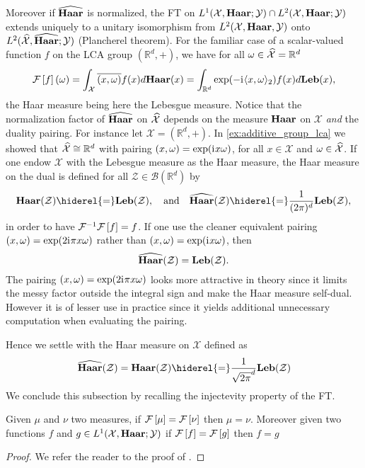 \paragraph{}
Moreover if $\widehat{\mathbf{Haar}}$ is normalized, the \acl{FT} on $L^1(\mathcal{X},\mathbf{Haar};\mathcal{Y})\cap L^2(\mathcal{X},\mathbf{Haar};\mathcal{Y})$ extends uniquely to a unitary isomorphism from $L^2(\mathcal{X}, \mathbf{Haar}, \mathcal{Y})$ onto $L^2(\widehat{\mathcal{X}}, \widehat{\mathbf{Haar}}; \mathcal{Y})$ (Plancherel theorem). For the familiar case of a scalar-valued function $f$ on the \acs{LCA} group $(\mathbb{R}^d, +)$, we have for all $\omega\in \widehat{\mathcal{X}}=\mathbb{R}^d$
\begin{dmath}
\label{fourier-R-plus}
\FT{f}(\omega)
=\int_{\mathcal{X}} \conj{\pairing{x,\omega}}f(x)d\Haar(x)
=\int_{\mathbb{R}^d} \exp(-\iu \inner{x,\omega}_2)f(x) d\Leb(x),
\end{dmath}
the Haar measure being here the Lebesgue measure. Notice that the normalization factor of $\widehat{\mathbf{Haar}}$ on $\widehat{\mathcal{X}}$ depends on the measure $\mathbf{Haar}$ on $\mathcal{X}$ \emph{and} the duality pairing. For instance let $\mathcal{X}=(\mathbb{R}^d, +)$. In \cref{ex:additive_group_lca} we showed that $\widehat{\mathcal{X}}\cong\mathbb{R}^d$ with pairing $(x,\omega)=\exp({\mathrm{i}\mkern1mu} x\omega)$, for all $x\in\mathcal{X}$ and $\omega\in\widehat{\mathcal{X}}$.
If one endow $\mathcal{X}$ with the Lebesgue measure as the Haar measure, the Haar measure on the dual is defined for all $\mathcal{Z}\in\mathcal{B}(\mathbb{R}^d)$ by
\begin{dmath*}
\Haar(\mathcal{Z})\hiderel{=}\Leb(\mathcal{Z}),
\quad\text{and}\quad
\dual{\Haar}(\mathcal{Z})\hiderel{=}\frac{1}{(2\pi)^d}\Leb(\mathcal{Z}),
\end{dmath*}
in order to have $\mathcal{F}^{-1}\mathcal{F}\left[f\right]=f$. If one use the cleaner equivalent pairing $(x,\omega)=\exp(2{\mathrm{i}\mkern1mu}\pi x\omega)$ rather than $(x,\omega)=\exp({\mathrm{i}\mkern1mu} x\omega)$, then
\begin{dmath*}
\dual{\Haar}(\mathcal{Z})=\Leb(\mathcal{Z}).
\end{dmath*}
The pairing $(x,\omega)=\exp(2{\mathrm{i}\mkern1mu}\pi x\omega)$ looks more attractive in theory since it limits the messy factor outside the integral sign and make the Haar measure self-dual. However it is of lesser use in practice since it yields additional unnecessary computation when evaluating the pairing.

Hence we settle with the Haar measure on $\mathcal{X}$ defined as
\begin{dmath*}
\dual{\Haar}(\mathcal{Z})=\Haar(\mathcal{Z})\hiderel{=}\frac{1}{\sqrt{2\pi}^d}\Leb(\mathcal{Z})
\end{dmath*}
We conclude this subsection by recalling the injectevity property of the \acl{FT}.
\begin{corollary}
Given $\mu$ and $\nu$ two measures, if $\mathcal{F}\left[\mu\right]=\mathcal{F}\left[\nu\right]$ then $\mu=\nu$. Moreover given two functions $f$ and $g\in L^1(\mathcal{X},\mathbf{Haar};\mathcal{Y})$ if $\mathcal{F}\left[f\right]=\mathcal{F}\left[g\right]$ then $f=g$
\end{corollary}
\begin{proof}
We refer the reader to the proof of \citet[corollary~4.34 page~112]{folland1994course}.
\end{proof}

